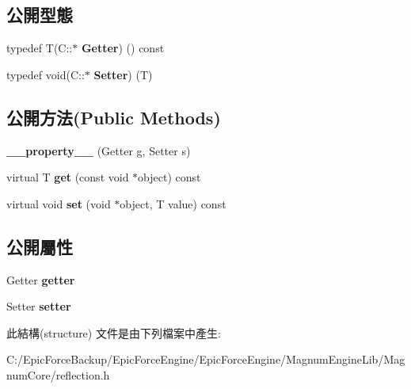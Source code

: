 \subsection*{公開型態}
\begin{DoxyCompactItemize}
\item 
typedef T(C\+::$\ast$ {\bfseries Getter}) () const \hypertarget{structagm_1_1reflection_1_1____property_____a0b38542cf6d2ad2d8b8bc7397b929202}{}\label{structagm_1_1reflection_1_1____property_____a0b38542cf6d2ad2d8b8bc7397b929202}

\item 
typedef void(C\+::$\ast$ {\bfseries Setter}) (T)\hypertarget{structagm_1_1reflection_1_1____property_____a611439cff6366d5ad0aff8200fb8928d}{}\label{structagm_1_1reflection_1_1____property_____a611439cff6366d5ad0aff8200fb8928d}

\end{DoxyCompactItemize}
\subsection*{公開方法(Public Methods)}
\begin{DoxyCompactItemize}
\item 
{\bfseries \+\_\+\+\_\+property\+\_\+\+\_\+} (Getter g, Setter s)\hypertarget{structagm_1_1reflection_1_1____property_____ae81596f5d1a1cb165847406fa2bbd66b}{}\label{structagm_1_1reflection_1_1____property_____ae81596f5d1a1cb165847406fa2bbd66b}

\item 
virtual T {\bfseries get} (const void $\ast$object) const \hypertarget{structagm_1_1reflection_1_1____property_____a3bfdd92184d1bd66f3885a95430f4311}{}\label{structagm_1_1reflection_1_1____property_____a3bfdd92184d1bd66f3885a95430f4311}

\item 
virtual void {\bfseries set} (void $\ast$object, T value) const \hypertarget{structagm_1_1reflection_1_1____property_____a1262bf07861e80bbfab72eab006d451d}{}\label{structagm_1_1reflection_1_1____property_____a1262bf07861e80bbfab72eab006d451d}

\end{DoxyCompactItemize}
\subsection*{公開屬性}
\begin{DoxyCompactItemize}
\item 
Getter {\bfseries getter}\hypertarget{structagm_1_1reflection_1_1____property_____a7095b883566f193f6ddadc6f790aee2f}{}\label{structagm_1_1reflection_1_1____property_____a7095b883566f193f6ddadc6f790aee2f}

\item 
Setter {\bfseries setter}\hypertarget{structagm_1_1reflection_1_1____property_____a40bd962fdf6debdb71c963b1c8cb7002}{}\label{structagm_1_1reflection_1_1____property_____a40bd962fdf6debdb71c963b1c8cb7002}

\end{DoxyCompactItemize}


此結構(structure) 文件是由下列檔案中產生\+:\begin{DoxyCompactItemize}
\item 
C\+:/\+Epic\+Force\+Backup/\+Epic\+Force\+Engine/\+Epic\+Force\+Engine/\+Magnum\+Engine\+Lib/\+Magnum\+Core/reflection.\+h\end{DoxyCompactItemize}
